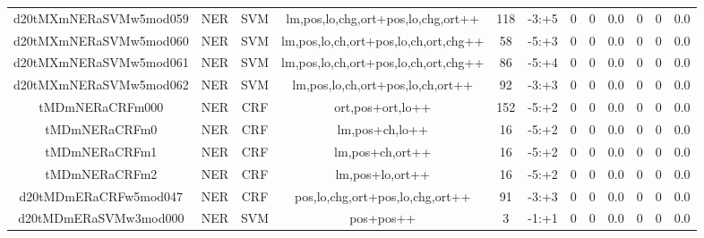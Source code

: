 \documentclass[a4paper]{article}
\begin{document}
\begin{landscape}
\begin{center}
\begin{tabular}{ |c|c|c|c|c|c|c|c|c|c|c|c|}
 
 	
 	\small{ d20tMXmNERaSVMw5mod059 } & \small{ NER} & \small{  SVM }  & lm,pos,lo,chg,ort+pos,lo,chg,ort++  &  118 &  \small{  -3:+5 }  &  0 & 0 & 0.0  &  0 & 0 & 0.0 \\
 	

 
 	
 	\small{ d20tMXmNERaSVMw5mod060 } & \small{ NER} & \small{  SVM }  & lm,pos,lo,ch,ort+pos,lo,ch,ort,chg++  &  58 &  \small{  -5:+3 }  &  0 & 0 & 0.0  &  0 & 0 & 0.0 \\
 	

 
 	
 	\small{ d20tMXmNERaSVMw5mod061 } & \small{ NER} & \small{  SVM }  & lm,pos,lo,ch,ort+pos,lo,ch,ort,chg++  &  86 &  \small{  -5:+4 }  &  0 & 0 & 0.0  &  0 & 0 & 0.0 \\
 	

 
 	
 	\small{ d20tMXmNERaSVMw5mod062 } & \small{ NER} & \small{  SVM }  & lm,pos,lo,ch,ort+pos,lo,ch,ort++  &  92 &  \small{  -3:+3 }  &  0 & 0 & 0.0  &  0 & 0 & 0.0 \\
 	

 
 	
 	\small{ tMDmNERaCRFm000 } & \small{ NER} & \small{  CRF }  & ort,pos+ort,lo++  &  152 &  \small{  -5:+2 }  &  0 & 0 & 0.0  &  0 & 0 & 0.0 \\
 	

 
 	
 	\small{ tMDmNERaCRFm0 } & \small{ NER} & \small{  CRF }  & lm,pos+ch,lo++  &  16 &  \small{  -5:+2 }  &  0 & 0 & 0.0  &  0 & 0 & 0.0 \\
 	

 
 	
 	\small{ tMDmNERaCRFm1 } & \small{ NER} & \small{  CRF }  & lm,pos+ch,ort++  &  16 &  \small{  -5:+2 }  &  0 & 0 & 0.0  &  0 & 0 & 0.0 \\
 	

 
 	
 	\small{ tMDmNERaCRFm2 } & \small{ NER} & \small{  CRF }  & lm,pos+lo,ort++  &  16 &  \small{  -5:+2 }  &  0 & 0 & 0.0  &  0 & 0 & 0.0 \\
 	

 
 	
 	\small{ d20tMDmERaCRFw5mod047 } & \small{ NER} & \small{  CRF }  & pos,lo,chg,ort+pos,lo,chg,ort++  &  91 &  \small{  -3:+3 }  &  0 & 0 & 0.0  &  0 & 0 & 0.0 \\
 	

 
 	
 	\small{ d20tMDmERaSVMw3mod000 } & \small{ NER} & \small{  SVM }  & pos+pos++  &  3 &  \small{  -1:+1 }  &  0 & 0 & 0.0  &  0 & 0 & 0.0 \\
 	


\end{tabular}
\end{center}
\end{landscape}
\end{document}
